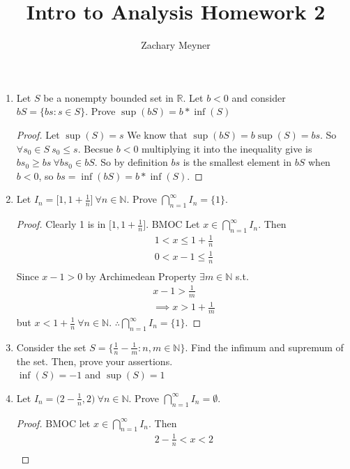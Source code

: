 \documentclass[12pt]{article}
\title{\large Intro to Analysis Homework 2}
\author{\large Zachary Meyner}
\date{}
\begin{document}
\maketitle
\begin{enumerate}
	\item Let $S$ be a nonempty bounded set in $\mathbb{R}$. Let $b<0$ and consider
	      $bS=\{bs:s \in S\}$. Prove $\sup(bS) = b * \inf(S)$
	      \begin{proof}
		      Let $\sup(S) = s$ We know that $\sup(bS) = b\sup(S) = bs$.  So $\forall s_0 \in S \ s_0 \leq s$.
		      Becsue $b < 0$ multiplying it into the inequality give is $bs_0 \geq bs \ \forall bs_0 \in bS$. So by
		      definition $bs$ is the smallest element in $bS$ when $b < 0$, so $bs = \inf(bS) = b*\inf(S)$.
	      \end{proof}
	\item Let $I_n = \Big[1, 1 + \frac{1}{n} \Big] \ \forall n \in \mathbb{N}$. Prove $\bigcap_{n=1}^{\infty} I_n = \{1\}$.
	      \begin{proof}
		      Clearly 1 is in $\Big[1, 1 + \frac{1}{n} \Big]$. BMOC Let $x \in \bigcap_{n=1}^{\infty}I_n$. Then
		      \begin{gather*}
			      1 < x \leq 1 + \frac{1}{n} \\
			      0 < x-1 \leq \frac{1}{n} \\
		      \end{gather*}
		      Since $x-1 > 0$ by Archimedean Property $\exists m \in \mathbb{N}$ s.t.
		      \begin{align*}
			      x-1 > \frac{1}{m} \\
			      \implies x > 1+\frac{1}{m}
		      \end{align*}
		      but $x < 1+ \frac{1}{n} \ \forall n \in \mathbb{N}$. $\therefore \bigcap_{n=1}^{\infty}I_n = \{1\}$.
	      \end{proof}
	\item Consider the set $S = \Big\{\frac{1}{n}-\frac{1}{m}: n,m \in \mathbb{N} \Big\}$. Find the infimum and supremum of the
	      set. Then, prove your assertions. \\
	      $\inf(S) = -1$ and $\sup(S) = 1$
	\item Let $I_n = \Big(2-\frac{1}{n},2\Big) \ \forall n \in \mathbb{N}$. Prove $\bigcap_{n=1}^{\infty}I_n = \emptyset$.
	      \begin{proof}
            BMOC let $x \in \bigcap_{n=1}^{\infty}I_n$. Then
            \begin{gather*}
                2-\frac{1}{n} < x < 2 \\

\end{gather*}
\end{proof}
\end{enumerate}
\end{document}
